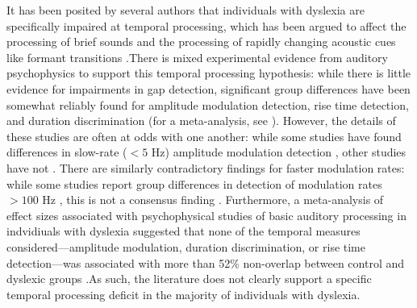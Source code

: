 \documentclass[../uwthesis.tex]{subfiles}
\begin{document}
It has been posited by several authors that individuals with dyslexia are specifically impaired at temporal processing, which has been argued to affect the processing of brief sounds \cite{Gaab2007NeuralStudy,Lehongre2011AlteredDyslexia,Richardson2004AuditoryChildren,Tallal1980AuditoryChildren} and the processing of rapidly changing acoustic cues like formant transitions \cite{Vandermosten2010AdultsCues,Vandermosten2011ImpairmentsDifficulties}.There is mixed experimental evidence from auditory psychophysics to support this temporal processing hypothesis: while there is little evidence for impairments in gap detection, significant group differences have been somewhat reliably found for amplitude modulation detection, rise time detection, and duration discrimination (for a meta-analysis, see \cite{Hamalainen2013BasicDyslexia}). However, the details of these studies are often at odds with one another: while some studies have found differences in slow-rate ($<5$ Hz) amplitude modulation detection \cite{Rocheron2002TemporalChildren,Stuart2006ASample}, other studies have not \cite{Amitay2002DisabledDeficit.,Rocheron2002TemporalChildren.,Witton2002SeparateReaders.}. There are similarly contradictory findings for faster modulation rates: while some studies report group differences in detection of modulation rates $>100$ Hz \cite{Lorenzi2000UseDyslexia, Menell1999PsychophysicalListeners, Rocheron2002TemporalChildren}, this is not a consensus finding \cite{Amitay2002DisabledDeficit.,Stuart2006ASample}. Furthermore, a meta-analysis of effect sizes associated with psychophysical studies of basic auditory processing in indvidiuals with dyslexia suggested that none of the temporal measures considered---amplitude modulation, duration discrimination, or rise time detection---was associated with more than 52\% non-overlap between control and dyslexic groups \cite{Hamalainen2013BasicDyslexia}.As such, the literature does not clearly support a specific temporal processing deficit in the majority of individuals with dyslexia.
\end{document}
